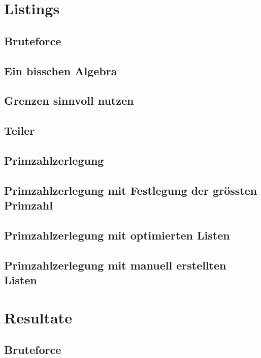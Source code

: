 \documentclass[10pt, fleqn]{article}
\begin{document}
\begin{appendices}

  \section{Listings}
  \subsection{Bruteforce}
  
  \subsection{Ein bisschen Algebra}
  
  \subsection{Grenzen sinnvoll nutzen}
  
  \subsection{Teiler}
  
  \subsection{Primzahlzerlegung}
  
  \subsection{Primzahlzerlegung mit Festlegung der grössten Primzahl}
  
  \subsection{Primzahlzerlegung mit optimierten Listen}
  
  \subsection{Primzahlzerlegung mit manuell erstellten Listen}
    

  \section{Resultate}
  \subsection{Bruteforce}
  

\end{appendices}
\end{document}
